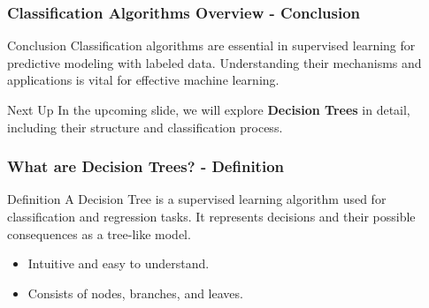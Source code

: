 \documentclass[aspectratio=169]{beamer}
\begin{document}
\begin{frame}[fragile]
    \frametitle{Classification Algorithms Overview - Conclusion}
    \begin{block}{Conclusion}
        Classification algorithms are essential in supervised learning for predictive modeling with labeled data. Understanding their mechanisms and applications is vital for effective machine learning.
    \end{block}
    \begin{block}{Next Up}
        In the upcoming slide, we will explore \textbf{Decision Trees} in detail, including their structure and classification process.
    \end{block}
\end{frame}

\begin{frame}[fragile]
    \frametitle{What are Decision Trees? - Definition}
    \begin{block}{Definition}
        A Decision Tree is a supervised learning algorithm used for classification and regression tasks. It represents decisions and their possible consequences as a tree-like model.
    \end{block}
    \begin{itemize}
        \item Intuitive and easy to understand.
        \item Consists of nodes, branches, and leaves.
    \end{itemize}
\end{frame}
\end{document}
